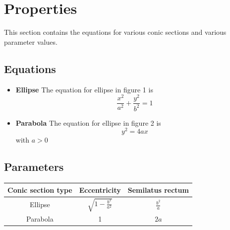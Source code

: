 \documentclass{article}
\begin{document}

\section{Properties}
This section contains the equations for various conic sections and various parameter values.
\subsection{Equations}
\begin{itemize}
	\item \textbf{Ellipse}
	The equation for ellipse in figure 1 is 
	\begin{equation}
		\frac{x^2}{a^2} + \frac{y^2}{b^2} = 1
	\end{equation}
	\item \textbf{Parabola}
	The equation for ellipse in figure 2 is
	\begin{equation}
		y^2 = 4ax
	\end{equation}
	with $a > 0$
\end{itemize}
\subsection{Parameters}
\begin{tabular}{|c|c|c|}
	\hline
	Conic section type & Eccentricity & Semilatus rectum \\
	\hline
	Ellipse & $\sqrt{1-\frac{b^2}{a^2}}$ & $\frac{b^2}{a}$ \\
	Parabola & 1 & $2a$ \\
	\hline
\end{tabular}
\end{document}
